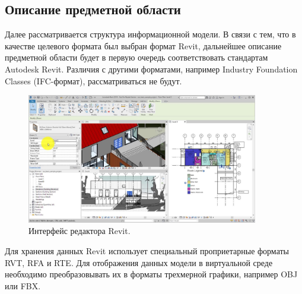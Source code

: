 ﻿\subsection{Описание предметной области}
\label{subsections:DomainModel}

Далее рассматривается структура информационной модели.
В связи с тем, что в качестве целевого формата был выбран  формат Revit,
дальнейшее описание предметной области будет в первую очередь
соответствовать стандартам Autodesk Revit.
Различия с другими форматами, например Industry Foundation Classes (IFC-формат),%
\cite{BuildingSmartIFC}
рассматриваться не будут.

\begin{figure}[ht]
    \centering
    \includegraphics[width=0.9\textwidth, frame]{images/Revit-interface.jpg}
    \caption{Интерфейс редактора Revit.%
    \cite{DocRevit}}
    \label{figure:RevitInterface}
\end{figure}

Для хранения данных Revit использует специальный проприетарные форматы RVT, RFA и RTE.
Для отображения данных модели в виртуальной среде необходимо
преобразовывать их в форматы трехмерной графики, например OBJ или FBX.



